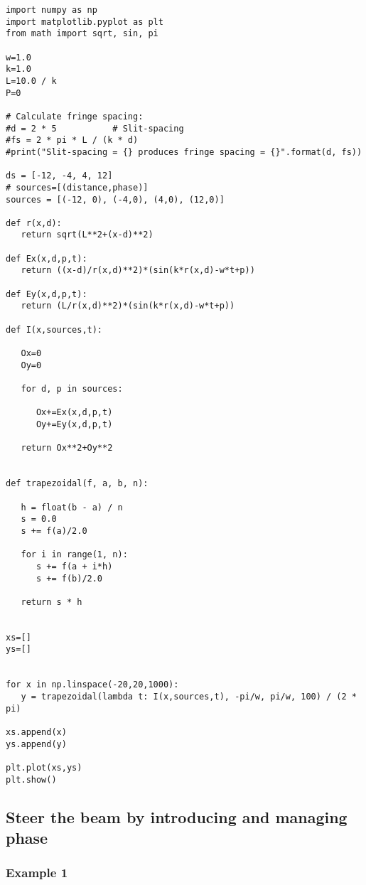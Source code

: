 \begin{Verbatim}[fontsize=\small,baselinestretch=0.9]
import numpy as np
import matplotlib.pyplot as plt
from math import sqrt, sin, pi

w=1.0
k=1.0
L=10.0 / k
P=0

# Calculate fringe spacing:
#d = 2 * 5           # Slit-spacing
#fs = 2 * pi * L / (k * d)
#print("Slit-spacing = {} produces fringe spacing = {}".format(d, fs))

ds = [-12, -4, 4, 12]
# sources=[(distance,phase)]
sources = [(-12, 0), (-4,0), (4,0), (12,0)]

def r(x,d):
   return sqrt(L**2+(x-d)**2)

def Ex(x,d,p,t):
   return ((x-d)/r(x,d)**2)*(sin(k*r(x,d)-w*t+p))

def Ey(x,d,p,t):
   return (L/r(x,d)**2)*(sin(k*r(x,d)-w*t+p))

def I(x,sources,t):

   Ox=0
   Oy=0

   for d, p in sources:

      Ox+=Ex(x,d,p,t)
      Oy+=Ey(x,d,p,t)

   return Ox**2+Oy**2


def trapezoidal(f, a, b, n):

   h = float(b - a) / n
   s = 0.0
   s += f(a)/2.0

   for i in range(1, n):
      s += f(a + i*h)
      s += f(b)/2.0

   return s * h


xs=[]
ys=[]


for x in np.linspace(-20,20,1000):
   y = trapezoidal(lambda t: I(x,sources,t), -pi/w, pi/w, 100) / (2 * pi)

xs.append(x)
ys.append(y)

plt.plot(xs,ys)
plt.show()   
\end{Verbatim}

\subsection{Steer the beam by introducing and managing phase}

\subsubsection{Example 1}\label{code:phase_right}

